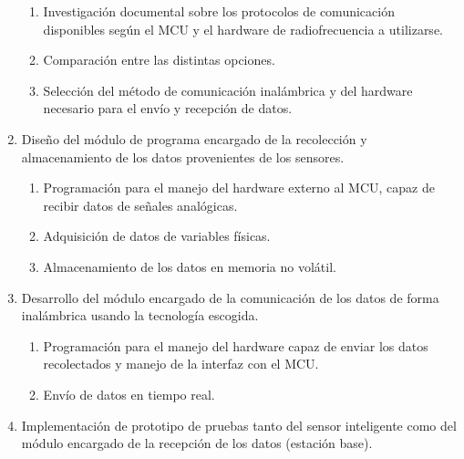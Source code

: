 \documentclass[12pt,letterpaper]{article}
\begin{document}
\begin{enumerate}[1.]
	
	\begin{enumerate}
		
		\item Investigación documental sobre los protocolos de comunicación disponibles según el MCU y el hardware de radiofrecuencia a utilizarse.
		
		\item Comparación entre las distintas opciones.
		
		\item Selección del método de comunicación inalámbrica y del hardware necesario para el envío y recepción de datos.
		
	\end{enumerate}
	
	
	\item Diseño del módulo de programa encargado de la recolección y almacenamiento
	de los datos provenientes de los sensores.

	
	\begin{enumerate}
				
		\item Programación para el manejo del hardware externo al MCU, capaz de recibir datos de señales analógicas.
		\item Adquisición de datos de variables físicas.
		\item Almacenamiento de los datos en memoria no volátil.
		
	\end{enumerate}

	\item Desarrollo del módulo encargado de la comunicación de los datos
	de forma inalámbrica usando la tecnología escogida.

	
	\begin{enumerate}
				
		\item Programación para el manejo del hardware capaz de enviar los datos recolectados y manejo de la interfaz con el MCU.
		\item Envío de datos en tiempo real.
		
	\end{enumerate}

	

	\item Implementación de prototipo de pruebas tanto del sensor inteligente como del módulo encargado de la recepción de los datos (estación base).
	
	
	\begin{enumerate}
		

\end{enumerate}
\end{enumerate}
\end{document}
